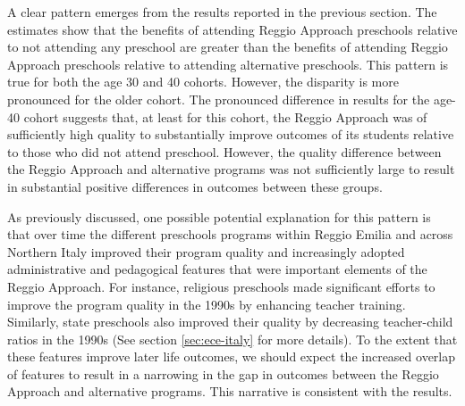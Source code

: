A clear pattern emerges from the results reported in the previous section. The estimates show that the benefits of attending Reggio Approach preschools relative to not attending any preschool are greater than the benefits of attending Reggio Approach preschools relative to attending alternative preschools. This pattern is true for both the age 30 and 40 cohorts. However, the disparity is more pronounced for the older cohort. The pronounced difference in results for the age-40 cohort suggests that, at least for this cohort, the Reggio Approach was of sufficiently high quality to substantially improve outcomes of its students relative to those who did not attend preschool. However, the quality difference between the Reggio Approach and alternative programs was not sufficiently large to result in substantial positive differences in outcomes between these groups.

As previously discussed, one possible potential explanation for this pattern is that over time the different preschools programs within Reggio Emilia and across Northern Italy improved their program quality and increasingly adopted administrative and pedagogical features that were important elements of the Reggio Approach. For instance, religious preschools made significant efforts to improve the program quality in the 1990s by enhancing teacher training. Similarly, state preschools also improved their quality by decreasing teacher-child ratios in the 1990s (See section \ref{sec:ece-italy} for more details). To the extent that these features improve later life outcomes, we should expect the increased overlap of features to result in a narrowing in the gap in outcomes between the Reggio Approach and alternative programs. This narrative is consistent with the results. 

